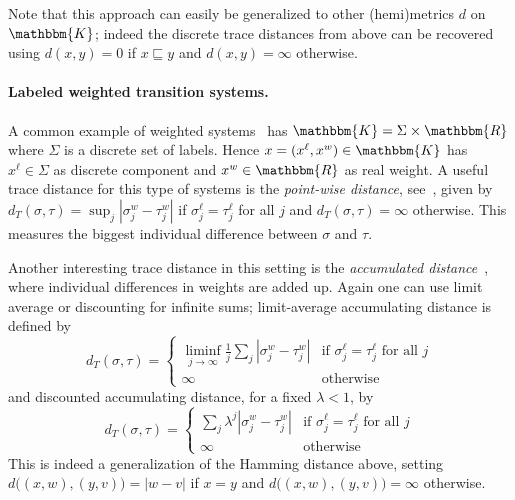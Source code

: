 \documentclass[copyright,creativecommons,sharealike]{eptcs}
\theoremstyle{plain}
\renewcommand*\K{\mathbbm{K}}
\newcommand*\Real{\mathbbm{R}}
\begin{document}
Note that this approach can easily be generalized to other
(hemi)metrics $d$ on $\K$; indeed the discrete trace distances from
above can be recovered using $d( x, y)= 0$ if $x\sqsubseteq y$ and $d(
x, y)= \infty$ otherwise.

\paragraph{Labeled weighted transition systems.}
\label{ex:wlts}

A common example of weighted
systems~\cite{DBLP:conf/formats/BouyerFLMS08,conf/concur/CernyHR10,conf/csl/ChatterjeeDH08,journals/jlap/ThraneFL10,DBLP:conf/concur/Breugel05}
has $\K= \Sigma\times \Real$ where $\Sigma$ is a discrete set of
labels.  Hence $x=( x^\ell, x^w)\in \K$ has $x^\ell\in \Sigma$ as
discrete component and $x^w\in \Real$ as real weight.  A useful trace
distance for this type of systems is the \emph{point-wise distance},
see~\cite{conf/icalp/AlfaroFS04,journals/jlap/ThraneFL10}, given by
$d_T( \sigma, \tau)= \sup_j| \sigma^w_j- \tau^w_j|$ if $\sigma^\ell_j=
\tau^\ell_j$ for all $j$ and $d_T( \sigma, \tau)= \infty$ otherwise.
This measures the biggest individual difference between $\sigma$ and
$\tau$.

Another interesting trace distance in this setting is the
\emph{accumulated distance}~\cite{journals/jlap/ThraneFL10}, where
individual differences in weights are added up.  Again one can use
limit average or discounting for infinite sums; limit-average
accumulating distance is defined by
\begin{equation*}
  d_T( \sigma, \tau)=
  \begin{cases}
    \liminf\limits_{ j\to \infty} \frac1j \sum_j| \sigma^w_j-
    \tau^w_j| &\text{if } \sigma^\ell_j= \tau^\ell_j \text{ for all }
    j \\
    \infty &\text{otherwise}
  \end{cases}
\end{equation*}
and discounted accumulating distance, for a fixed $\lambda< 1$, by
\begin{equation*}
  d_T( \sigma, \tau)=
  \begin{cases}
    \sum_j \lambda^j| \sigma^w_j- \tau^w_j| &\text{if }
    \sigma^\ell_j= \tau^\ell_j \text{ for all } j \\
    \infty &\text{otherwise}
  \end{cases}
\end{equation*}
This is indeed a generalization of the Hamming distance above, setting
$d\big(( x, w),( y, v)\big)=| w- v|$ if $x= y$ and $d\big(( x, w),( y,
v)\big)= \infty$ otherwise.
\end{document}
